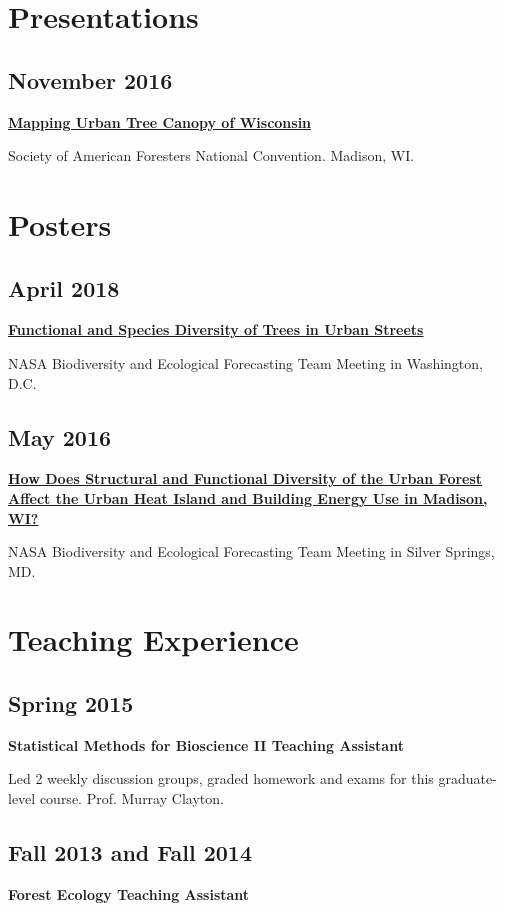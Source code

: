 \documentclass{article}
\begin{document}
\section*{Presentations}
\label{sec:org9ea6e51}
\subsection*{November 2016}
\label{sec:orgb70bf2e}
\textbf{\href{http://pages.stat.wisc.edu/\~erker/Presentations/SAF\_20161105/saf\_presentation.html}{Mapping Urban Tree Canopy of Wisconsin}}

Society of American Foresters National Convention. Madison, WI.
\section*{Posters}
\label{sec:org5f664c4}
\subsection*{April 2018}
\label{sec:orgf7f6c73}
\textbf{\href{http://pages.stat.wisc.edu/\~erker/Posters/NASA\_poster\_2018.jpg}{Functional and Species Diversity of Trees in Urban Streets}}

NASA Biodiversity and Ecological Forecasting Team Meeting in
Washington, D.C.
\subsection*{May 2016}
\label{sec:orgf8c5cfc}
\textbf{\href{http://pages.stat.wisc.edu/\~erker/Posters/NASA\_poster\_2016.jp2}{How Does Structural and Functional Diversity of the Urban Forest
Affect the Urban Heat Island and Building Energy Use in Madison, WI?}}

NASA Biodiversity and Ecological Forecasting Team Meeting in Silver Springs, MD.
\section*{Teaching Experience}
\label{sec:org2f94a38}
\subsection*{Spring 2015}
\label{sec:org44f30d5}
\textbf{Statistical Methods for Bioscience II Teaching Assistant}

Led 2 weekly discussion groups, graded homework and exams for this
graduate-level course. Prof. Murray Clayton.

\subsection*{Fall 2013 and Fall 2014}
\label{sec:org9530473}
\textbf{Forest Ecology Teaching Assistant}
\end{document}

